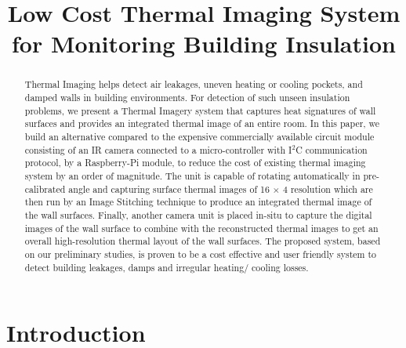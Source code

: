 \documentclass{sig-alternate}
\begin{document}
\title{Low Cost Thermal Imaging System for Monitoring Building Insulation}

\maketitle

\begin{abstract}
   Thermal Imaging helps detect air leakages, uneven heating or cooling pockets, and damped walls in building environments. For detection of such unseen insulation problems, we present a Thermal Imagery system that captures heat signatures of wall surfaces and provides an integrated thermal image of an entire room. In this paper, we build an alternative compared to the expensive commercially available circuit module consisting of an IR camera connected to a micro-controller with I$^2$C communication protocol, by a Raspberry-Pi module, to reduce the cost of existing thermal imaging system by an order of magnitude. The unit is capable of rotating automatically in pre-calibrated angle and capturing surface thermal images of 16 $\times$ 4 resolution which are then run by an Image Stitching technique to produce an integrated thermal image of the wall surfaces. Finally, another camera unit is placed in-situ to capture the digital images of the wall surface to combine with the reconstructed thermal images to get an overall high-resolution thermal layout of the wall surfaces. The proposed system, based on our preliminary studies, is proven to be a cost effective and user friendly system to detect building leakages, damps and irregular heating/ cooling losses.
\end{abstract}

\section{Introduction}
\end{document}
